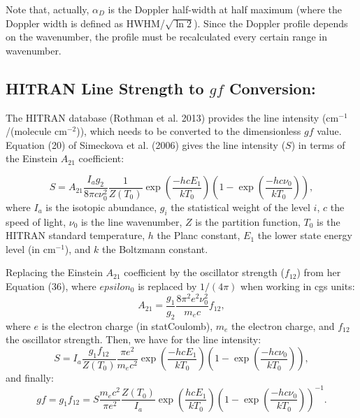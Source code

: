 \documentclass[letterpaper,12pt]{article}
\begin{document}
{Note that, actually, $\alpha_D$ is the Doppler half-width at half
maximum (where the Doppler width is defined as HWHM/$\sqrt{\ln 2}$).
Since the Doppler profile depends on the wavenumber, the profile must
be recalculated every certain range in wavenumber. \newline

\subsection{HITRAN Line Strength to $gf$ Conversion:}

The HITRAN database 
(Rothman et al. 2013) 
provides the line
intensity (cm$^{-1}$/(molecule cm$^{-2}$)), which needs to be
converted to the dimensionless $gf$ value.  Equation (20) of
Simeckova et al. (2006) 
gives the line intensity ($S$) in
terms of the Einstein $A_{21}$ coefficient:

\begin{equation}
S = A_{21} \frac{I_a g_2}{8\pi c \nu_0^2}
           \frac{1}{Z(T_0)}
           \exp\left(\frac{-hcE_1}{kT_0}\right)
           \left(1-\exp\left(\frac{-hc\nu_0}{kT_0}\right)\right),
\end{equation}
where $I_a$ is the isotopic abundance, $g_i$ the statistical weight of
the level $i$, $c$ the speed of light, $\nu_0$ is the line wavenumber,
$Z$ is the partition function, $T_0$ is the HITRAN standard
temperature, $h$ the Planc constant, $E_1$ the lower state energy
level (in cm$^{-1}$), and $k$ the Boltzmann constant.

Replacing the Einstein $A_{21}$ coefficient by the
oscillator strength ($f_{12}$) from her Equation (36), where
$epsilon_0$ is replaced by $1/(4\pi)$ when working in cgs units:
\begin{equation}
A_{21} = \frac{g_1}{g_2}\frac{8 \pi^2 e^2 \nu_0^2}{m_e c} f_{12},
\end{equation}
where $e$ is the electron charge (in statCoulomb), $m_e$ the
electron charge, and $f_{12}$ the oscillator strength.
Then, we have for the line intensity:
\begin{equation}
S = I_a \frac{g_1 f_{12}}{Z(T_0)} \frac{\pi e^2} {m_e c^2}
        \exp\left(\frac{-hcE_1}{kT_0}\right)
        \left(1-\exp\left(\frac{-hc\nu_0}{kT_0}\right)\right),
\end{equation}
and finally:
\begin{equation}
gf = g_1 f_{12} = S \frac{m_e c^2} {\pi e^2} \frac{Z(T_0)}{I_a} 
        \exp\left(\frac{hcE_1}{kT_0}\right)
        \left(1-\exp\left(\frac{-hc\nu_0}{kT_0}\right)\right)^{-1}.
\end{equation}

}
\end{document}
